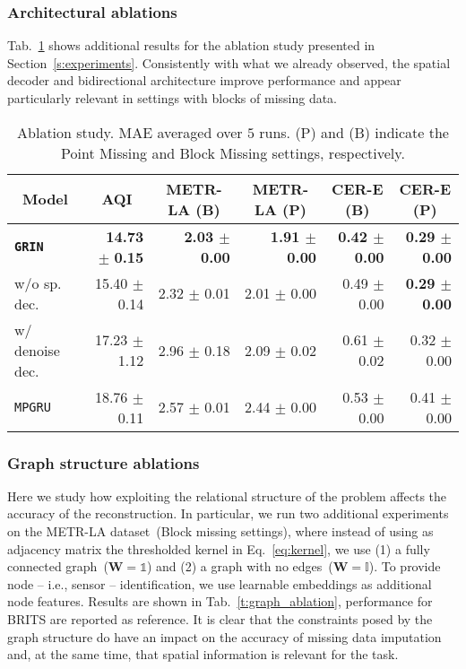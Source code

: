 \documentclass{article} \usepackage{iclr2022_conference,times}
\def\mW{{\bm{W}}}
\newcommand{\GRIL}{\texttt{GRIN}}
\begin{document}
\subsubsection{Architectural ablations}
\label{a:ablation}
Tab.~\ref{t:ablation_full} shows additional results for the ablation study presented in Section~\ref{s:experiments}. Consistently with what we already observed, the spatial decoder and bidirectional architecture improve performance and appear particularly relevant in settings with blocks of missing data.
\begin{table}[ht]
\vspace{-0.2cm}
\caption{Ablation study. MAE averaged over $5$ runs. (P) and (B) indicate the Point Missing and Block Missing settings, respectively.}
\vspace{0.1cm}
\centering
\begin{tabular}{ l | r | r | r | r | r }
\toprule
 \multicolumn{1}{c}{Model}&\multicolumn{1}{|c}{AQI} & \multicolumn{1}{|c}{METR-LA (B)} & \multicolumn{1}{|c}{METR-LA (P)} & \multicolumn{1}{|c}{CER-E (B)} & \multicolumn{1}{|c}{CER-E (P)} \\
\midrule
\texttt{\textbf{\GRIL}}  & \textbf{14.73} {\tiny $\pm$ \textbf{0.15}} & \textbf{2.03 {\tiny $\pm$ 0.00}} & \textbf{1.91 {\tiny $\pm$ 0.00}} & \textbf{0.42 {\tiny $\pm$ 0.00}} & \textbf{0.29 {\tiny $\pm$ 0.00}}\\
\midrule[0.3pt]
w/o sp. dec. & 15.40 {\tiny $\pm$ 0.14} & 2.32 {\tiny $\pm$ 0.01} & 2.01 {\tiny $\pm$ 0.00} & 0.49 {\tiny $\pm$ 0.00} & \textbf{0.29 {\tiny $\pm$ 0.00}}\\
w/ denoise dec. & 17.23 {\tiny $\pm$ 1.12} & 2.96 {\tiny $\pm$ 0.18} & 2.09 {\tiny $\pm$ 0.02} & 0.61 {\tiny $\pm$ 0.02} & 0.32 {\tiny $\pm$ 0.00}\\
\texttt{MPGRU} & 18.76 {\tiny $\pm$ 0.11} & 2.57 {\tiny $\pm$ 0.01} & 2.44 {\tiny $\pm$ 0.00} & 0.53 {\tiny $\pm$ 0.00} & 0.41 {\tiny $\pm$ 0.00}\\
\bottomrule
\end{tabular}
\label{t:ablation_full}
\end{table} 
\subsubsection{Graph structure ablations}

Here we study how exploiting the relational structure of the problem affects the accuracy of the reconstruction. In particular, we run two additional experiments on the METR-LA dataset~(Block missing settings), where instead of using as adjacency matrix the thresholded kernel in Eq.~\ref{eq:kernel}, we use (1) a fully connected graph~($\mW = \mathds{1}$) and (2) a graph with no edges~($\mW = \mathds{I}$). To provide node -- i.e., sensor -- identification, we use learnable embeddings as additional node features. Results are shown in Tab.~\ref{t:graph_ablation}, performance for BRITS are reported as reference. It is clear that the constraints posed by the graph structure do have an impact on the accuracy of missing data imputation and, at the same time, that spatial information is relevant for the task.
\end{document}

